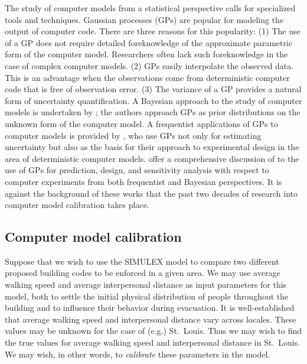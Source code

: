 \documentclass{article}
\begin{document}
The study of computer models from a statistical perspective calls for specialized tools and techniques. Gaussian processes (GPs) are popular for modeling the output of computer code. There are three reasons for this popularity: (1) The use of a GP does not require detailed foreknowledge of the approximate parametric form of the computer model. Researchers often lack such foreknowledge in the case of complex computer models. (2) GPs easily interpolate the observed data. This is an advantage when the observations come from deterministic computer code that is free of observation error. (3) The variance of a GP provides a natural form of uncertainty quantification. 
A Bayesian approach to the study of computer models is undertaken by \cite{Currin1991}; the authors approach GPs as prior distributions on the unknown form of the computer model. A frequentist applications of GPs to computer models is provided by \cite{Sacks1989}, who use GPs not only for estimating uncertainty but also as the basis for their approach to experimental design in the area of deterministic computer models.  \cite{Santner2003a} offer a comprehensive discussion of to the use of GPs for prediction, design, and sensitivity analysis with respect to computer experiments from both frequentist and Bayesian perspectives. It is against the background of these works that the past two decades of research into computer model calibration takes place.

\subsection{Computer model calibration} \label{computer_model_calibration}

Suppose that we wish to use the SIMULEX model to compare two different proposed building codes to be enforced in a given area. We may use average walking speed and average interpersonal distance as input parameters for this model, both to settle the initial physical distribution of people throughout the building and to influence their behavior during evacuation. It is well-established that average walking speed \citep{Bornstein1976} and interpersonal distance \citep{Sorokowska2017} vary across locales. These values may be unknown for the case of (e.g.) St.\ Louis. Thus we may wish to find the true values for average walking speed and interpersonal distance in St.\ Louis. We may wish, in other words, to \textit{calibrate} these parameters in the model.
\end{document}
